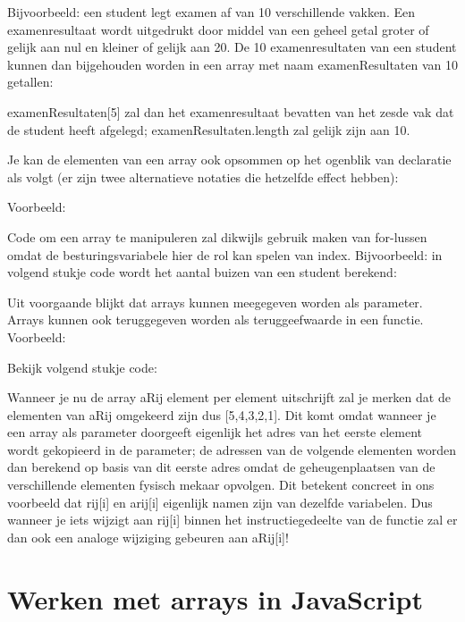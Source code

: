 Bijvoorbeeld: een student legt examen af van 10 verschillende vakken. Een examenresultaat wordt uitgedrukt door middel van een geheel getal groter of gelijk aan nul en kleiner of gelijk aan 20. De 10 examenresultaten van een student kunnen dan bijgehouden worden in een array met naam examenResultaten van 10 getallen:


examenResultaten[5] zal dan het examenresultaat bevatten van het zesde vak dat de student heeft afgelegd; examenResultaten.length zal gelijk zijn aan 10.

Je kan de elementen van een array ook opsommen op het ogenblik van declaratie als volgt (er zijn twee alternatieve notaties die hetzelfde effect hebben):


Voorbeeld:


Code om een array te manipuleren zal dikwijls gebruik maken van for-lussen omdat de besturingsvariabele hier de rol kan spelen van index. Bijvoorbeeld: in volgend stukje code wordt het aantal buizen van een student berekend:


Uit voorgaande blijkt dat arrays kunnen meegegeven worden als parameter. Arrays kunnen ook teruggegeven worden als teruggeefwaarde in een functie. Voorbeeld:


Bekijk volgend stukje code:


Wanneer je nu de array aRij element per element uitschrijft zal je merken dat de elementen van aRij omgekeerd zijn dus [5,4,3,2,1]. Dit komt omdat wanneer je een array als parameter doorgeeft eigenlijk het adres van het eerste element wordt gekopieerd in de parameter; de adressen van de volgende elementen worden dan berekend op basis van dit eerste adres omdat de geheugenplaatsen van de verschillende elementen fysisch mekaar opvolgen. Dit betekent concreet in ons voorbeeld dat rij[i] en arij[i] eigenlijk namen zijn van dezelfde variabelen. Dus wanneer je iets wijzigt aan rij[i] binnen het instructiegedeelte van de functie zal er dan ook een analoge wijziging gebeuren aan aRij[i]!

\section{Werken met arrays in JavaScript}

